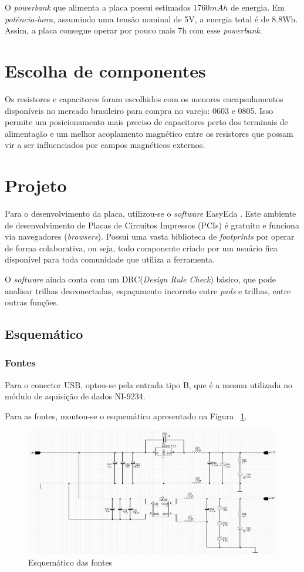 \documentclass[
	12pt,				%
	openright,			%
	twoside,			%
	a4paper,			%
	english,			%
	french,				%
	spanish,			%
	brazil,				%
	]{abntex2}
\begin{document}
		O \textit{powerbank} que alimenta a placa possui estimados $1760mAh$ de
		energia. Em \textit{potência-hora}, assumindo uma tensão nominal
		de 5V, a energia total é de 8.8Wh. Assim, a placa consegue operar
		por pouco mais 7h com esse \textit{powerbank}.

	\section{Escolha de componentes}
		Os resistores e capacitores foram escolhidos com os menores
		encapsulamentos disponíveis no mercado brasileiro para compra no varejo:
		0603 e 0805. Isso permite um posicionamento mais preciso de capacitores
		perto dos terminais de alimentação e um melhor acoplamento magnético
		entre os resistores que possam vir a ser influenciados por campos
		magnéticos externos.

	\section{Projeto}
		Para o desenvolvimento da placa, utilizou-se o \textit{software}
		EasyEda \cite{easyEda}. Este ambiente de desenvolvimento de Placas de Circuitos Impressos (PCIs) é gratuito e funciona via navegadores (\textit{browsers}). Possui uma
		vasta biblioteca de \textit{footprints} por operar de forma
		colaborativa, ou seja, todo componente criado por um usuário fica
		disponível para toda comunidade que utiliza a ferramenta.

		O \textit{software} ainda conta com um DRC(\textit{Design Rule
		Check}) básico, que pode analisar trilhas desconectadas, espaçamento
		incorreto entre \textit{pads} e trilhas, entre outras funções.
		\subsection{Esquemático}
			\subsubsection{Fontes}
				Para o conector USB, optou-se pela entrada tipo B, que é a
				mesma utilizada no módulo de aquisição de dados NI-9234.

				Para as fontes, montou-se o esquemático apresentado na Figura ~\ref{fig:esquematicoFontes}.

				\begin{figure}[!ht]
					\centering
					\includegraphics[width=\linewidth]{../Fotos/fonte.jpg}
					\caption{Esquemático das fontes}
					\label{fig:esquematicoFontes}
				\end{figure}
\end{document}
